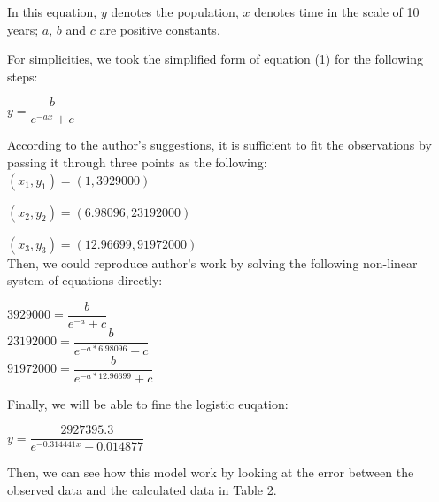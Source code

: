 \documentclass[a4paper]{article}
\begin{document}
In this equation, $y$ denotes the population, $x$ denotes time in the scale of 10 years; $a$, $b$ and $c$ are positive constants. \

For simplicities, we took the simplified form of equation (1) for the following steps: \

\begin{center}

$y = \dfrac{b}{e^{-ax}+c}$

\end{center}

According to the author's suggestions, it is sufficient to fit the observations by passing it through three points as the following: \\


\hspace{3.8cm} $(x_1,y_1) = (1, 3929000)$ \

\hspace{3.8cm} $(x_2, y_2) = (6.98096, 23192000)$ \

\hspace{3.8cm} $(x_3, y_3) = (12.96699, 91972000)$ \\


Then, we could reproduce author's work by solving the following non-linear system of equations directly: \

\begin{center}
$3929000 = \dfrac{b}{e^{-a}+c}$ \\ 
$23192000 = \dfrac{b}{e^{-a*6.98096}+c}$ \\ 
$91972000 = \dfrac{b}{e^{-a*12.96699}+c}$ \\
\end{center}

Finally, we will be able to fine the logistic euqation: \

\begin{center}

$y = \dfrac{2927395.3}{e^{- 0.314441x}+ 0.014877}$ \

\end{center}

Then, we can see how this model work by looking at the error between the observed data and the calculated data in Table 2. \
\end{document}
